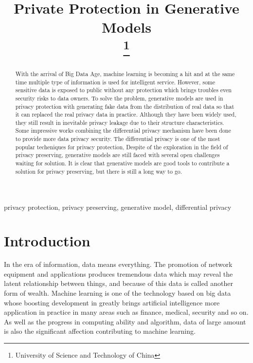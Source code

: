 \documentclass[conference]{IEEEtran}
\begin{document}
\title{Private Protection in Generative Models\\
\thanks{University of Science and Technology of China}
}

\author{
\and
{}
\and
{}
}

\maketitle

\begin{abstract}
With the arrival of Big Data Age, machine learning is becoming a hit and at the same time multiple type of information is used for intelligent service. However, some sensitive data is exposed to public without any protection which brings troubles even security risks to data owners. To solve the problem, generative models are used in privacy protection with generating fake data from the distribution of real data so that it can replaced the real privacy data in practice. Although they have been widely used, they still result in inevitable privacy leakage due to their structure characteristics. Some impressive works combining the differential privacy mechanism have been done to provide more data privacy security. The differential privacy is one of the most popular techeniques for privacy protection, Despite of the exploration in the field of privacy preserving, generative models are still faced with several open challenges waiting for solution. It is clear that generative models are good tools to contribute a solution for privacy preserving, but there is still a long way to go.
\end{abstract}

\begin{IEEEkeywords}
privacy protection, privacy preserving, generative model, differential privacy
\end{IEEEkeywords}

\section{Introduction}
In the era of information, data means everything. The promotion of network equipment and applications produces tremendous data which may reveal the latent relationship between things, and because of this data is called another form of wealth. Machine learning is one of the technology based on big data whose boosting development in  greatly brings artificial intelligence more application in practice in many areas such as finance, medical, security and so on. As well as the progress in computing ability and algorithm, data of large amount is also the significant affection contributing to machine learning.
\end{document}

